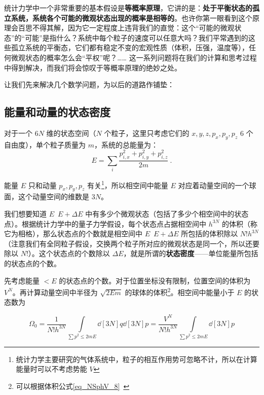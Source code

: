 
\begin{issues}
\issueDraft
\end{issues}


统计力学中一个非常重要的基本假设是\textbf{等概率原理}，它讲的是：\textbf{处于平衡状态的孤立系统，系统各个可能的微观状态出现的概率是相等的}。也许你第一眼看到这个原理会百思不得其解，因为它一定程度上违背我们的直觉：这个“可能的微观状态”的“可能”是指什么？系统中每个粒子的速度可以任意大吗？我们平常遇到的这些孤立系统的平衡态，它们都有稳定不变的宏观性质（体积，压强，温度等），任何微观状态的概率怎么会“平权”呢？…… 这一系列问题将在我们的计算和思考过程中得到解决，而我们将会惊叹于等概率原理的绝妙之处。

让我们先来解决几个数学问题，为以后的道路作铺垫：
\subsection{能量和动量的状态密度}
对于一个 $6N$ 维的状态空间（$N$ 个粒子，这里只考虑它们的 $x,y,z,p_x,p_y,p_z$ $6$ 个自由度），单个粒子质量为 $m$，系统的总能量为：
\begin{equation}
E=\sum_{i} \frac{p_{i,x}^2+p_{i,y}^2+p_{i,z}^2}{2m}~.
\end{equation}

能量 $E$ 只和动量 $p_x,p_y,p_z$ 有关\footnote{统计力学主要研究的气体系统中，粒子的相互作用势可忽略不计，所以在计算能量时可以不考虑势能 $V$}，所以相空间中能量 $E$ 对应着动量空间的一个球面，这个动量空间的维数是 $3N$。

我们想要知道 $E$~$E+\Delta E$ 中有多少个微观状态（包括了多少个相空间中的状态点）。根据统计力学中的量子力学假设，每个状态点占据相空间中 $h^{3N}$ 的体积（称它为相格），那么状态点的个数就是相空间中 $E$~$E+\Delta E$ 所包括的体积除以 $N!h^{3N}$（注意我们有全同粒子假设，交换两个粒子所对应的微观状态是同一个，所以还要除以 $N!$）。这个状态点的个数除以 $\Delta E$，就是所谓的\textbf{状态密度}——单位能量所包括的状态点的个数。

先考虑能量 $<E$ 的状态点的个数。对于位置坐标没有限制，位置空间的体积为 $V^N$。再计算动量空间中半径为 $\sqrt{2Em}$ 的球体的体积\footnote{可以根据体积公式\autoref{eq_NSphV_8}~}。相空间中能量小于 $E$ 的状态数为

\begin{equation}\label{eq_IdSDp_1}
\Omega_0 = \frac{1}{N! h^{3N}} \int\limits_{\sum p^2 \leqslant 2mE} \dd[3N]{q} \dd[3N]{p} = \frac{V^N}{N! h^{3N}} \int\limits_{\sum p^2 \leqslant 2mE} \dd[3N]{p}
\end{equation}



